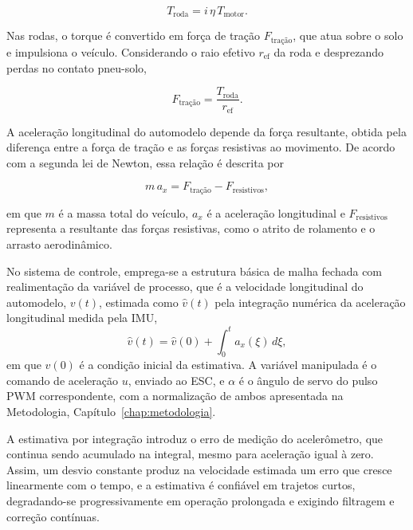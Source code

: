 \begin{equation*}
T_{\mathrm{roda}} = i\,\eta\,T_{\mathrm{motor}}.
\end{equation*}

Nas rodas, o torque é convertido em força de tração \(F_{\text{tra\c{c}\~{a}o}}\), que atua sobre o solo e impulsiona 
o veículo. Considerando o raio efetivo \(r_{\mathrm{ef}}\) da roda e desprezando perdas no contato pneu-solo,

\begin{equation*}
F_{\text{tra\c{c}\~{a}o}} = \frac{T_{\mathrm{roda}}}{r_{\mathrm{ef}}}.
\end{equation*}

A aceleração longitudinal do automodelo depende da força resultante, obtida pela 
diferença entre a força de tração e as forças resistivas ao movimento. De acordo com a segunda lei de Newton,
essa relação é descrita por

\begin{equation}
\label{eq:newton}
m\,a_x = F_{\text{tra\c{c}\~{a}o}} - F_{\mathrm{resistivos}},
\end{equation}

em que \(m\) é a massa total do veículo, \(a_x\) é a aceleração longitudinal e \(F_{\mathrm{resistivos}}\) 
representa a resultante das forças resistivas, como o atrito de rolamento e o arrasto aerodinâmico.

No sistema de controle, emprega-se a estrutura básica de malha fechada com realimentação da
variável de processo, que é a velocidade longitudinal do automodelo, \(v(t)\), estimada como \(\hat{v}(t)\) pela
integração numérica da aceleração longitudinal medida pela IMU,
\begin{equation*}
\hat{v}(t) = \hat{v}(0) + \int_0^t a_x(\xi)\,d\xi,
\end{equation*}
em que \(\hat{v}(0)\) é a condição inicial da estimativa.
A variável
manipulada é o comando de aceleração \(u\), enviado ao ESC, e \(\alpha\) é o ângulo de servo do
pulso PWM correspondente, com a normalização de ambos apresentada na Metodologia,
Capítulo~\ref{chap:metodologia}.

A estimativa por integração introduz o erro de medição do acelerômetro, que continua
sendo acumulado na integral, mesmo para aceleração igual à zero. Assim, um desvio constante
produz na velocidade estimada um erro que cresce linearmente com o tempo, e a estimativa é
confiável em trajetos curtos, degradando-se progressivamente em operação prolongada e
exigindo filtragem e correção contínuas.

